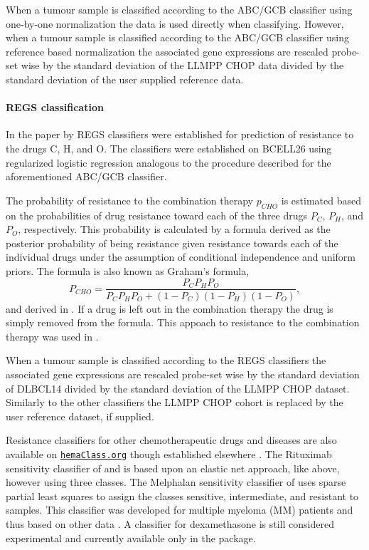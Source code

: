 \documentclass[10pt,letterpaper]{article}
\newcommand{\hemaClass}{\href{http://hemaClass.org}{\texttt{hemaClass.org}}}
\begin{document}
When a tumour sample is classified according to the ABC/GCB classifier using one-by-one normalization the data is used directly when classifying. However, when a tumour sample is classified according to the ABC/GCB classifier using reference based normalization the associated gene expressions are rescaled probe-set wise by the standard deviation of the LLMPP CHOP data divided by the standard deviation of the user supplied reference data.

\paragraph{REGS classification}
\label{sec:regsmethods}
In the paper by \cite{Falgreen2015} REGS classifiers were established for prediction of resistance to the drugs C, H, and O.
The classifiers were established on BCELL26 using regularized logistic regression analogous to the procedure described for the aforementioned ABC/GCB classifier.

The probability of resistance to the combination therapy $p_{CHO}$ is estimated based on the probabilities of drug resistance toward each of the three drugs $P_C$, $P_H$, and $P_O$, respectively.
This probability is calculated by a formula derived as the posterior probability of being resistance given resistance towards each of the individual drugs under the assumption of conditional independence and uniform priors.
The formula is also known as Graham's formula,
\begin{equation*}
  P_{CHO} = \frac{P_C P_H P_O}{P_C P_H P_O + (1 - P_C)(1 - P_H)(1 - P_O)},
\end{equation*}
and derived in .
If a drug is left out in the combination therapy the drug is simply removed from the formula.
This appoach to resistance to the combination therapy was used in \cite{Falgreen2015}.

When a tumour sample is classified according to the REGS classifiers the associated gene expressions are rescaled probe-set wise by the standard deviation of DLBCL14 divided by the standard deviation of the LLMPP CHOP dataset.
Similarly to the other classifiers the LLMPP CHOP cohort is replaced by the user reference dataset, if supplied.

Resistance classifiers for other chemotherapeutic drugs and diseases are also available on \hemaClass{} though established elsewhere \cite{Boegsted2011,Bogsted2013,Laursen2014}.
The Rituximab sensitivity classifier of \cite{Laursen2014} and \cite{Laursen2015} is based upon an elastic net approach, like above, however using three classes.
The Melphalan sensitivity classifier of \cite{Boegsted2011} uses sparse partial least squares to assign the classes sensitive, intermediate, and resistant to samples.
This classifier was developed for multiple myeloma (MM) patients and thus based on other data \cite{Boegsted2011}.
A classifier for dexamethasone is still considered experimental and currently available only in the package.
\end{document}
